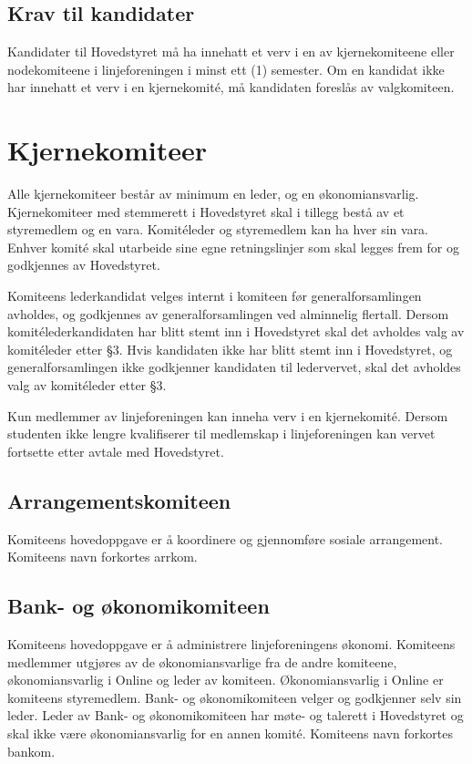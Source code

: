 \subsection{Krav til kandidater}{
Kandidater til Hovedstyret må ha innehatt et verv i en av kjernekomiteene eller nodekomiteene i linjeforeningen i minst ett (1) semester. Om en kandidat ikke har innehatt et verv i en kjernekomité, må kandidaten foreslås av valgkomiteen.
}



\section{Kjernekomiteer}
\label{sec:komiteer}
\vspace{23pt}

Alle kjernekomiteer består av minimum en leder, og en økonomiansvarlig. Kjernekomiteer med stemmerett i Hovedstyret skal i tillegg bestå av et styremedlem og en vara. Komitéleder og styremedlem kan ha hver sin vara. Enhver komité skal utarbeide sine egne retningslinjer som skal legges frem for og godkjennes av Hovedstyret. \newline

Komiteens lederkandidat velges internt i komiteen før generalforsamlingen avholdes, og godkjennes av generalforsamlingen ved alminnelig flertall. Dersom komitélederkandidaten har blitt stemt inn i Hovedstyret skal det avholdes valg av komitéleder etter §3. Hvis kandidaten ikke har blitt stemt inn i Hovedstyret, og generalforsamlingen ikke godkjenner kandidaten til ledervervet, skal det avholdes valg av komitéleder etter §3.\newline

Kun medlemmer av linjeforeningen kan inneha verv i en kjernekomité. Dersom studenten ikke lengre kvalifiserer til medlemskap i linjeforeningen kan vervet fortsette etter avtale med Hovedstyret.

\vspace{-10pt}
\subsection{Arrangementskomiteen}{
Komiteens hovedoppgave er å koordinere og gjennomføre sosiale arrangement. Komiteens navn forkortes arrkom.

}

\vspace{-10pt}
\subsection{Bank- og økonomikomiteen}{
Komiteens hovedoppgave er å administrere linjeforeningens økonomi. Komiteens medlemmer utgjøres av de økonomiansvarlige fra de andre komiteene, økonomiansvarlig i Online og leder av komiteen. Økonomiansvarlig i Online er komiteens styremedlem. Bank- og økonomikomiteen velger og godkjenner selv sin leder. Leder av Bank- og økonomikomiteen har møte- og talerett i Hovedstyret og skal ikke være økonomiansvarlig for en annen komité. Komiteens navn forkortes bankom.
}

